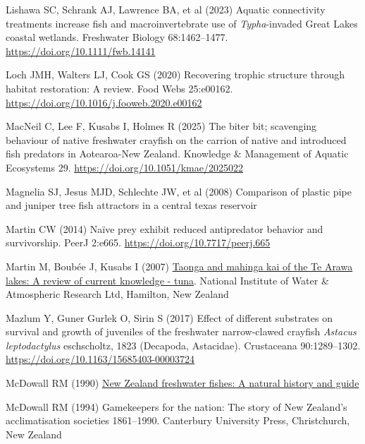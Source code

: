 \documentclass[
  12pt,
  a4paper,
]{scrbook}
\newlength{\cslhangindent}
\newenvironment{CSLReferences}[2] %
 {\begin{list}{}{%
  \setlength{\itemindent}{0pt}
  \setlength{\leftmargin}{0pt}
  \setlength{\parsep}{0pt}
  \ifodd #1
   \setlength{\leftmargin}{\cslhangindent}
   \setlength{\itemindent}{-1\cslhangindent}
  \fi
  \setlength{\itemsep}{#2\baselineskip}}}
 {\end{list}}
\begin{document}
\begin{CSLReferences}{1}{1}
Lishawa SC, Schrank AJ, Lawrence BA, et al (2023) Aquatic connectivity
treatments increase fish and macroinvertebrate use of
{\emph{Typha}}-invaded {Great Lakes} coastal wetlands. Freshwater
Biology 68:1462--1477. \url{https://doi.org/10.1111/fwb.14141}

Loch JMH, Walters LJ, Cook GS (2020) Recovering trophic structure
through habitat restoration: A review. Food Webs 25:e00162.
\url{https://doi.org/10.1016/j.fooweb.2020.e00162}

MacNeil C, Lee F, Kusabs I, Holmes R (2025) The biter bit; scavenging
behaviour of native freshwater crayfish on the carrion of native and
introduced fish predators in {Aotearoa-New Zealand}. Knowledge \&
Management of Aquatic Ecosystems 29.
\url{https://doi.org/10.1051/kmae/2025022}

Magnelia SJ, Jesus MJD, Schlechte JW, et al (2008) Comparison of plastic
pipe and juniper tree fish attractors in a central texas reservoir

Martin CW (2014) Naïve prey exhibit reduced antipredator behavior and
survivorship. PeerJ 2:e665. \url{https://doi.org/10.7717/peerj.665}

Martin M, Boubée J, Kusabs I (2007)
\href{https://niwa.co.nz/sites/default/files/2025-04/te_arawa_species_report_tuna_0.pdf}{Taonga
and mahinga kai of the {Te Arawa} lakes: A review of current knowledge -
tuna}. {National Institute of Water} \& {Atmospheric Research Ltd},
{Hamilton}, {New Zealand}

Mazlum Y, Guner Gurlek O, Sirin S (2017) Effect of different substrates
on survival and growth of juveniles of the freshwater narrow-clawed
crayfish {\emph{Astacus leptodactylus}} eschscholtz, 1823 ({Decapoda,
Astacidae}). Crustaceana 90:1289--1302.
\url{https://doi.org/10.1163/15685403-00003724}

McDowall RM (1990)
\href{https://agris.fao.org/search/en/providers/122621/records/6473966cce9437aa76003d0e}{{New
Zealand} freshwater fishes: A natural history and guide}

McDowall RM (1994) Gamekeepers for the nation: The story of {New
Zealand}'s acclimatisation societies 1861--1990. Canterbury University
Press, Christchurch, New Zealand


\end{CSLReferences}
\end{document}
